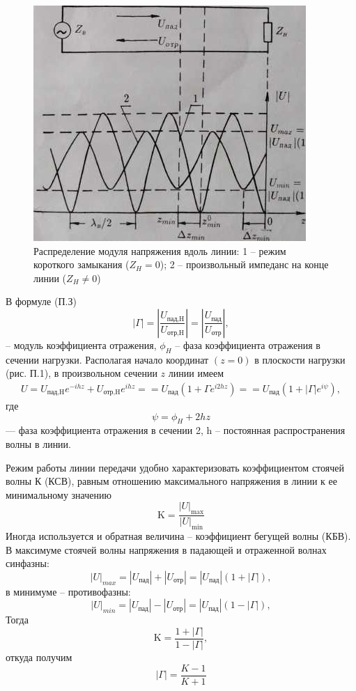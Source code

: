 ﻿\documentclass[a4paper,11pt]{article}
\begin{document}
\begin{figure}[h!]
	\centering
	\includegraphics{img/2.jpg}
	\caption{Распределение модуля напряжения вдоль линии: 1 -- режим короткого замыкания ($Z_H=0$); 2 -- произвольный импеданс на конце линии ($Z_H\ne0$)}
	\label{fig:p1}
\end{figure}
В формуле (П.З)
\begin{equation}
	|\Gamma|=\left|\frac{U_\text{пад,H}}{U_\text{отр,H}}\right|=\left|\frac{U_\text{пад}}{U_\text{отр}}\right|,
\end{equation}
-- модуль коэффициента отражения, $\phi_H$ -- фаза коэффициента отражения в сечении нагрузки. Располагая начало координат $(z = 0)$ в плоскости нагрузки (рис. П.1), в произвольном сечении $z$ линии имеем
\begin{gather}
	U=U_\text{пад,H}e^{-ihz}+U_\text{отр,H}e^{ihz}=
		=U_\text{пад}(1+\Gamma e^{i2hz})=
		=U_\text{пад}(1+|\Gamma|e^{i\psi}),
\end{gather}
где
\begin{equation}
	\psi=\phi_H+2hz
\end{equation}
--- фаза коэффициента отражения в сечении 2, h -- постоянная распространения волны в линии.

Режим работы линии передачи удобно характеризовать коэффициентом стоячей волны К (КСВ), равным отношению максимального напряжения в линии к ее минимальному значению
\begin{equation}
	\mathrm { K } = \frac { | U | _ { \max } } { | U | _ { \min } }
\end{equation}
Иногда используется и обратная величина -- коэффициент бегущей волны (КБВ). В максимуме стоячей волны напряжения в падающей и отраженной волнах синфазны:
\begin{equation}
	|U|_{max}=|U_\text{пад}|+|U_\text{отр}|=|U_\text{пад}|(1+|\Gamma|),
\end{equation}
в минимуме -- противофазны:
\begin{equation}
	|U|_{min}=|U_\text{пад}|-|U_\text{отр}|=|U_\text{пад}|(1-|\Gamma|),
\end{equation}
Тогда
\begin{equation}
	\mathrm { K } = \frac { 1 + | \Gamma | } { 1 - | \Gamma | },
\end{equation}
откуда получим
\begin{equation}
	| \Gamma | = \frac { K - 1 } { K + 1 }
\end{equation}
\end{document}
